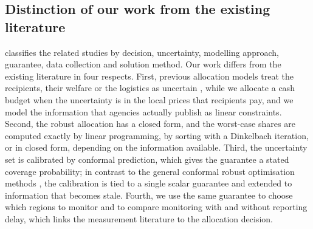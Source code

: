 \documentclass[preprint,12pt,number]{elsarticle}%
\theoremstyle{definition}
\theoremstyle{remark}
\begin{document}
\subsection{Distinction of our work from the existing literature}

 classifies the related studies by decision, uncertainty, modelling approach, guarantee, data collection and solution method. Our work differs from the existing literature in four respects. First, previous allocation models treat the recipients, their welfare or the logistics as uncertain \citep{zheng2022targeting,orgut2016modeling,noyan2016stochastic}, while we allocate a cash budget when the uncertainty is in the local prices that recipients pay, and we model the information that agencies actually publish as linear constraints. Second, the robust allocation has a closed form, and the worst-case shares are computed exactly by linear programming, by sorting with a Dinkelbach iteration, or in closed form, depending on the information available. Third, the uncertainty set is calibrated by conformal prediction, which gives the guarantee a stated coverage probability; in contrast to the general conformal robust optimisation methods \citep{johnstone2021conformal,patel2024conformal,yeh2025endtoend}, the calibration is tied to a single scalar guarantee and extended to information that becomes stale. Fourth, we use the same guarantee to choose which regions to monitor and to compare monitoring with and without reporting delay, which links the measurement literature \citep{dietrich2023lost,andree2021estimating} to the allocation decision.
\end{document}
